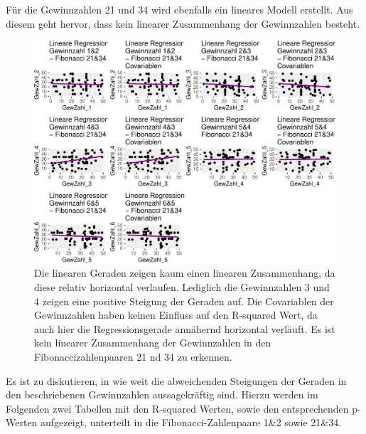 \documentclass[ngerman,]{article}
\begin{document}
Für die Gewinnzahlen 21 und 34 wird ebenfalls ein lineares Modell
erstellt. Aus diesem geht hervor, dass kein linearer Zusammenhang der
Gewinnzahlen besteht.

\begin{figure}

\includegraphics{Abbildung/ergebnis_linear_2-1} \hfill{}

\caption{Die linearen Geraden zeigen kaum einen linearen Zusammenhang, da diese relativ horizontal verlaufen. Lediglich die Gewinnzahlen 3 und 4 zeigen eine positive Steigung der Geraden auf. Die Covariablen der Gewinnzahlen haben keinen Einfluss auf den R-squared Wert, da auch hier die Regressionsgerade annähernd horizontal verläuft. Es ist kein linearer Zusammenhang der Gewinnzahlen in den Fibonaccizahlenpaaren 21 nd 34 zu erkennen.}\label{fig:ergebnis_linear_2}
\end{figure}

Es ist zu diskutieren, in wie weit die abweichenden Steigungen der
Geraden in den beschriebenen Gewinnzahlen aussagekräftig sind. Hierzu
werden im Folgenden zwei Tabellen mit den R-squared Werten, sowie den
entsprechenden p-Werten aufgezeigt, unterteilt in die
Fibonacci-Zahlenpaare 1\&2 sowie 21\&34.\newline\newline\newline
\end{document}
